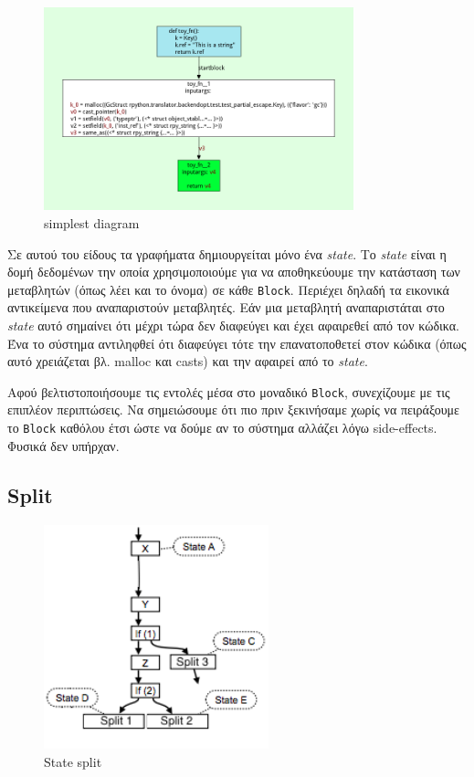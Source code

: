 \begin{figure}[h]
\centering
\includegraphics[width=0.8\textwidth]{simplest-func.png}
\caption{simplest diagram}
\label{figure-4}
\end{figure}

Σε αυτού του είδους τα γραφήματα δημιουργείται μόνο ένα \textit{state}. Το
\textit{state} είναι η δομή δεδομένων την οποία χρησιμοποιούμε για να
αποθηκεύουμε την κατάσταση των μεταβλητών (όπως λέει και το όνομα) σε κάθε
\texttt{Block}. Περιέχει δηλαδή τα εικονικά αντικείμενα που αναπαριστούν
μεταβλητές. Εάν μια μεταβλητή αναπαριστάται στο \textit{state} αυτό σημαίνει ότι
μέχρι τώρα δεν διαφεύγει και έχει αφαιρεθεί από τον κώδικα. Ένα το σύστημα
αντιληφθεί ότι διαφεύγει τότε την επανατοποθετεί στον κώδικα  (όπως αυτό
χρειάζεται βλ. malloc και casts) και την αφαιρεί από το \textit{state}.

Αφού βελτιστοποιήσουμε τις εντολές μέσα στο μοναδικό \texttt{Block}, συνεχίζουμε
με τις επιπλέον περιπτώσεις. Να σημειώσουμε ότι πιο πριν ξεκινήσαμε χωρίς να
πειράξουμε το \texttt{Block} καθόλου έτσι ώστε να δούμε αν το σύστημα αλλάζει
λόγω side-effects. Φυσικά δεν υπήρχαν.

\subsection{Split}

\begin{figure}
\caption{State split}
\label{wrapped-figure}
\includegraphics[width=6.5cm]{split-state.png}
\end{figure} 

